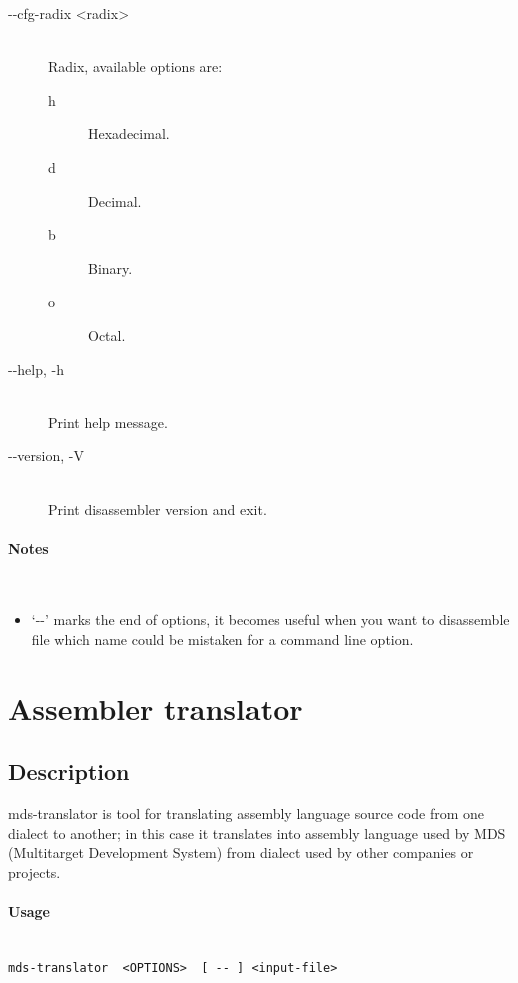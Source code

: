 \begin{description}
            \item[-{}-cfg-radix <radix>]~\\
                Radix, available options are:
                \begin{description}
                    \item [h] Hexadecimal.
                    \item [d] Decimal.
                    \item [b] Binary.
                    \item [o] Octal.
                \end{description}

            \item[-{}-help, -h]~\\
                Print help message.

            \item[-{}-version, -V]~\\
                Print disassembler version and exit.
        \end{description}

    \paragraph{Notes}~\\
        \begin{itemize}
            \item `-{}-' marks the end of options, it becomes useful when you want to disassemble file which name could be mistaken for a command line option.
        \end{itemize}

\section{Assembler translator}
    \subsection{Description}
        mds-translator is tool for translating assembly language source code from one dialect to another; in this case it translates into assembly language used by MDS (Multitarget Development System) from dialect used by other companies or projects.

    \paragraph{Usage}~\\
        \verb'mds-translator  <OPTIONS>  [ -- ] <input-file>'

